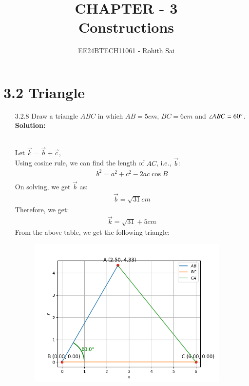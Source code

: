 \documentclass[journal]{IEEEtran}
\begin{document}

\vspace{3cm}

\title{CHAPTER - 3\\Constructions}
\author{EE24BTECH11061 - Rohith Sai}
{\let\newpage\relax\maketitle}

\renewcommand{\thefigure}{\theenumi}
\renewcommand{\thetable}{\theenumi}
\setlength{\intextsep}{10pt} %

\renewcommand{\thetable}{\theenumi}

\section{3.2 Triangle}
\begin{enumerate}
\item [3.2.8] Draw a triangle $ABC$ in which $AB = 5cm$, $BC = 6cm$ and $\angle ABC = 60\degree$.\\
\textbf{Solution:}
\begin{table}[h!]
      \centering
      
      \caption{}
\end{table}\\
Let $\vec{k} = \vec{b} + \vec{c}$,\\
Using cosine rule, we can find the length of $AC$, i.e., $\vec{b}$:
\begin{align}
    b^2 = a^2 + c^2 - 2ac\cos{B}\\
\end{align}
On solving, we get $\vec{b}$ as:
\begin{align}
    \vec{b} = \sqrt{31}cm
\end{align}
Therefore, we get:
\begin{align}
    \vec{k} = \sqrt{31} + 5 cm
\end{align}
From the above table, we get the following triangle:
\begin{figure}
    \centering
    \includegraphics[width=10cm]{figs/figure.png}
    \caption{}
    \label{fig:enter-label}
\end{figure}
\end{enumerate}
\end{document}

